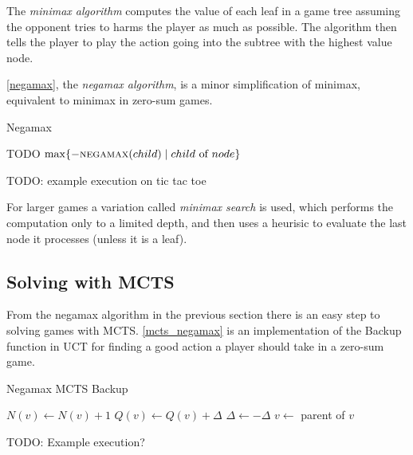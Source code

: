 The {\em minimax algorithm} computes the value of each leaf in a game
tree assuming the opponent tries to harms the player as much as
possible. The algorithm then tells the player to play the action going
into the subtree with the highest value node.

\autoref{negamax}, the {\em negamax algorithm}, is a minor simplification
of minimax, equivalent to minimax in zero-sum games.

\begin{algorithm}
\caption{Negamax}
\label{negamax}
\begin{algorithmic}
        \State \Return TODO
    \EndIf
    \State \Return $\max \{ - \Call{negamax}{child}
        \mid child \text{ of } node \}$
\EndFunction
\end{algorithmic}
\end{algorithm}


TODO: example execution on tic tac toe

For larger games a variation called {\em minimax search} is used, which
performs the computation only to a limited depth, and then uses
a heurisic to evaluate the last node it processes (unless it is a leaf).

\subsection{Solving with MCTS}

From the negamax algorithm in the previous section there is an easy step
to solving games with MCTS. \autoref{mcts_negamax} is an
implementation of the Backup function in UCT for finding a good
action a player should take in a zero-sum game.

\begin{algorithm}
\caption{Negamax MCTS Backup}
\label{mcts_negamax}
\begin{algorithmic}
        \State $N(v) \gets N(v) + 1$
        \State $Q(v) \gets Q(v) + \Delta$
        \State $\Delta \gets - \Delta$
        \State $v \gets $ parent of $v$
    \EndWhile
\EndFunction
\end{algorithmic}
\end{algorithm}

TODO: Example execution?


